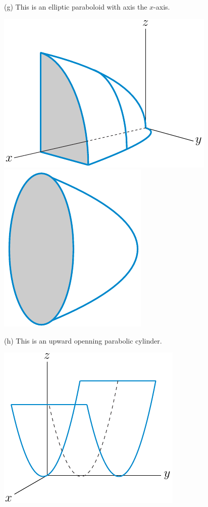 \begin{answer}
(g)
This is an elliptic paraboloid with axis the $x$-axis.
\begin{center}
     \includegraphics{fig/paraboloidX_l.pdf}\qquad
     \includegraphics[scale=0.8]{fig/paraboloidX_r.pdf}
\end{center}

(h)
This is an upward openning parabolic cylinder.
\begin{center}
     \includegraphics{fig/parabolicCylinder.pdf}
\end{center}



\end{answer}

